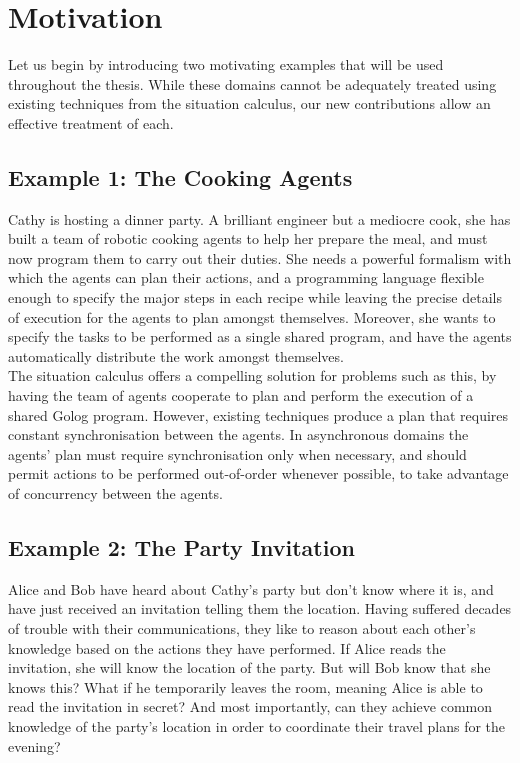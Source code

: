 \section{Motivation}

Let us begin by introducing two motivating examples that will be used
throughout the thesis. While these domains cannot be adequately treated
using existing techniques from the situation calculus, our new contributions
allow an effective treatment of each.


\subsection*{Example 1: The Cooking Agents}

Cathy is hosting a dinner party. A brilliant engineer but a mediocre
cook, she has built a team of robotic cooking agents to help her prepare
the meal, and must now program them to carry out their duties. She
needs a powerful formalism with which the agents can plan their actions,
and a programming language flexible enough to specify the major steps
in each recipe while leaving the precise details of execution for
the agents to plan amongst themselves. Moreover, she wants to specify
the tasks to be performed as a single shared program, and have the
agents automatically distribute the work amongst themselves.\\


The situation calculus offers a compelling solution for problems such
as this, by having the team of agents cooperate to plan and perform
the execution of a shared Golog program. However, existing techniques
produce a plan that requires constant synchronisation between the
agents. In asynchronous domains the agents' plan must require synchronisation
only when necessary, and should permit actions to be performed out-of-order
whenever possible, to take advantage of concurrency between the agents.


\subsection*{Example 2: The Party Invitation}

Alice and Bob have heard about Cathy's party but don't know where
it is, and have just received an invitation telling them the location.
Having suffered decades of trouble with their communications, they
like to reason about each other's knowledge based on the actions they
have performed. If Alice reads the invitation, she will know the location
of the party. But will Bob know that she knows this? What if he temporarily
leaves the room, meaning Alice is able to read the invitation in secret?
And most importantly, can they achieve common knowledge of the party's
location in order to coordinate their travel plans for the evening?\\


